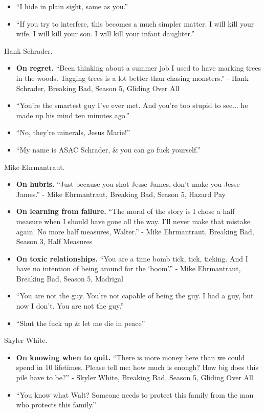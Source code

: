 \documentclass{article}
\begin{document}
\begin{enumerate}
\begin{itemize}
		\item ``I hide in plain sight, same as you.''
		\item ``If you try to interfere, this becomes a much simpler matter. I will kill your wife. I will kill your son. I will kill your infant daughter.''
	\end{itemize}
	{\sc Hank Schrader.}
	\begin{itemize}
		\item {\bf On regret.} ``Been thinking about a summer job I used to have marking trees in the woods. Tagging trees is a lot better than chasing monsters.'' - Hank Schrader, Breaking Bad, Season 5, Gliding Over All
		\item ``You're the smartest guy I've ever met. And you're too stupid to see$\ldots$ he made up his mind ten minutes ago.''
		\item ``No, they're minerals, Jesus Marie!''
		\item ``My name is ASAC Schrader, \& you can go fuck yourself.''
	\end{itemize}
	{\sc Mike Ehrmantraut.}
	\begin{itemize}
		\item {\bf On hubris.} ``Just because you shot Jesse James, don't make you Jesse James.'' - Mike Ehrmantraut, Breaking Bad, Season 5, Hazard Pay
		\item {\bf On learning from failure.} ``The moral of the story is I chose a half measure when I should have gone all the way. I'll never make that mistake again. No more half measures, Walter.'' - Mike Ehrmantraut, Breaking Bad, Season 3, Half Measures
		\item {\bf On toxic relationships.} ``You are a time bomb tick, tick, ticking. And I have no intention of being around for the `boom'.'' - Mike Ehrmantraut, Breaking Bad, Season 5, Madrigal
		\item ``You are not the guy. You're not capable of being the guy. I had a guy, but now I don't. You are not the guy.''
		\item ``Shut the fuck up \& let me die in peace''
	\end{itemize}
	{\sc Skyler White.}
	\begin{itemize}
		\item {\bf On knowing when to quit.} ``There is more money here than we could spend in 10 lifetimes. Please tell me: how much is enough? How big does this pile have to be?'' - Skyler White, Breaking Bad, Season 5, Gliding Over All
		\item ``You know what Walt? Someone needs to protect this family from the man who protects this family.''

\end{itemize}
\end{enumerate}
\end{document}
